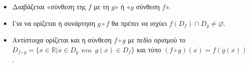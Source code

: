 \documentclass[twoside,nofonts,ektypwsh,math,spyros]{frontisthrio}
\begin{document}
\begin{itemize}[itemsep=0mm]
\item Διαβάζεται «σύνθεση της $ f $ με τη $ g $» ή «$ g $ σύνθεση $ f $».
\item Για να ορίζεται η συνάρτηση $ g\circ f $ θα πρέπει να ισχύει $ f(D_f)\cap D_g\neq\varnothing $.
\item Αντίστοιχα ορίζεται και η σύνθεση $ f\circ g $ με πεδίο ορισμού το $ D_{f\circ g}=\{x\in\mathbb{R}|x\in D_g\ \ \textrm{και}\ \ g(x)\in D_f\} $ και τύπο $ (f\circ g)(x)=f(g(x)) $.
\end{itemize}
\end{document}
